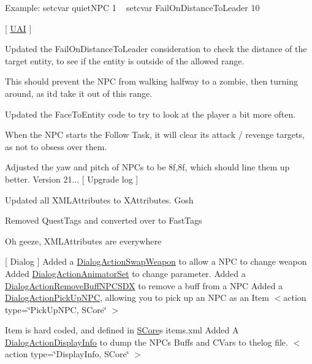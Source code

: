 Example\+: setcvar quiet\+NPC 1 ~\newline
 setcvar Fail\+On\+Distance\+To\+Leader 10

\mbox{[} \mbox{\hyperlink{namespace_u_a_i}{UAI}} \mbox{]}
\begin{DoxyItemize}
\item Updated the Fail\+On\+Distance\+To\+Leader consideration to check the distance of the target entity, to see if the entity is outside of the allowed range.
\begin{DoxyItemize}
\item This should prevent the NPC from walking halfway to a zombie, then turning around, as it\textquotesingle{}d take it out of this range.
\end{DoxyItemize}
\item Updated the Face\+To\+Entity code to try to look at the player a bit more often.
\item When the NPC starts the Follow Task, it will clear its attack / revenge targets, as not to obsess over them.
\item Adjusted the yaw and pitch of NPCs to be 8f,8f, which should line them up better. Version 21... \mbox{[} Upgrade log \mbox{]}
\item Updated all XMLAttributes to XAttributes. Gosh
\item Removed Quest\+Tags and converted over to Fast\+Tags
\item Oh geeze, XMLAttributes are everywhere
\end{DoxyItemize}

\mbox{[} Dialog \mbox{]} Added a \mbox{\hyperlink{class_dialog_action_swap_weapon}{Dialog\+Action\+Swap\+Weapon}} to allow a NPC to change weapon \label{md__read_me_gunNPCPipeShotgun}%
%
 Added \mbox{\hyperlink{class_dialog_action_animator_set}{Dialog\+Action\+Animator\+Set}} to change parameter. \label{md__read_me_PistolUser}%
%
 Added a \mbox{\hyperlink{class_dialog_action_remove_buff_n_p_c_s_d_x}{Dialog\+Action\+Remove\+Buff\+NPCSDX}} to remove a buff from a NPC \label{md__read_me_PistolUser}%
%
 Added a \mbox{\hyperlink{class_dialog_action_pick_up_n_p_c}{Dialog\+Action\+Pick\+Up\+NPC}}, allowing you to pick up an NPC as an Item $<$action type=\char`\"{}\+Pick\+Up\+NPC, SCore\char`\"{} $>$
\begin{DoxyItemize}
\item Item is hard coded, and defined in \mbox{\hyperlink{namespace_s_core}{SCore}}\textquotesingle{}s items.\+xml Added A \mbox{\hyperlink{class_dialog_action_display_info}{Dialog\+Action\+Display\+Info}} to dump the NPCs Buffs and CVars to thelog file. $<$action type=\char`\"{}\+Display\+Info, SCore\char`\"{} $>$
\end{DoxyItemize}

